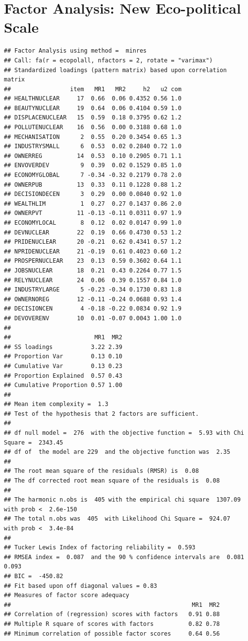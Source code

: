 \documentclass[
]{article}
\begin{document}
\newpage

\hypertarget{factor-analysis-new-eco-political-scale}{%
\section{Factor Analysis: New Eco-political
Scale}\label{factor-analysis-new-eco-political-scale}}

\begin{verbatim}
## Factor Analysis using method =  minres
## Call: fa(r = ecopolall, nfactors = 2, rotate = "varimax")
## Standardized loadings (pattern matrix) based upon correlation matrix
##                 item   MR1   MR2     h2   u2 com
## HEALTHNUCLEAR     17  0.66  0.06 0.4352 0.56 1.0
## BEAUTYNUCLEAR     19  0.64  0.06 0.4104 0.59 1.0
## DISPLACENUCLEAR   15  0.59  0.18 0.3795 0.62 1.2
## POLLUTENUCLEAR    16  0.56  0.00 0.3188 0.68 1.0
## MECHANISATION      2  0.55  0.20 0.3454 0.65 1.3
## INDUSTRYSMALL      6  0.53  0.02 0.2840 0.72 1.0
## OWNERREG          14  0.53  0.10 0.2905 0.71 1.1
## ENVOVERDEV         9  0.39  0.02 0.1529 0.85 1.0
## ECONOMYGLOBAL      7 -0.34 -0.32 0.2179 0.78 2.0
## OWNERPUB          13  0.33  0.11 0.1228 0.88 1.2
## DECISIONDECEN      3  0.29  0.00 0.0840 0.92 1.0
## WEALTHLIM          1  0.27  0.27 0.1437 0.86 2.0
## OWNERPVT          11 -0.13 -0.11 0.0311 0.97 1.9
## ECONOMYLOCAL       8  0.12  0.02 0.0147 0.99 1.0
## DEVNUCLEAR        22  0.19  0.66 0.4730 0.53 1.2
## PRIDENUCLEAR      20 -0.21  0.62 0.4341 0.57 1.2
## NPRIDENUCLEAR     21 -0.19  0.61 0.4023 0.60 1.2
## PROSPERNUCLEAR    23  0.13  0.59 0.3602 0.64 1.1
## JOBSNUCLEAR       18  0.21  0.43 0.2264 0.77 1.5
## RELYNUCLEAR       24  0.06  0.39 0.1557 0.84 1.0
## INDUSTRYLARGE      5 -0.23 -0.34 0.1730 0.83 1.8
## OWNERNOREG        12 -0.11 -0.24 0.0688 0.93 1.4
## DECISIONCEN        4 -0.18 -0.22 0.0834 0.92 1.9
## DEVOVERENV        10  0.01 -0.07 0.0043 1.00 1.0
## 
##                        MR1  MR2
## SS loadings           3.22 2.39
## Proportion Var        0.13 0.10
## Cumulative Var        0.13 0.23
## Proportion Explained  0.57 0.43
## Cumulative Proportion 0.57 1.00
## 
## Mean item complexity =  1.3
## Test of the hypothesis that 2 factors are sufficient.
## 
## df null model =  276  with the objective function =  5.93 with Chi Square =  2343.45
## df of  the model are 229  and the objective function was  2.35 
## 
## The root mean square of the residuals (RMSR) is  0.08 
## The df corrected root mean square of the residuals is  0.08 
## 
## The harmonic n.obs is  405 with the empirical chi square  1307.09  with prob <  2.6e-150 
## The total n.obs was  405  with Likelihood Chi Square =  924.07  with prob <  3.4e-84 
## 
## Tucker Lewis Index of factoring reliability =  0.593
## RMSEA index =  0.087  and the 90 % confidence intervals are  0.081 0.093
## BIC =  -450.82
## Fit based upon off diagonal values = 0.83
## Measures of factor score adequacy             
##                                                    MR1  MR2
## Correlation of (regression) scores with factors   0.91 0.88
## Multiple R square of scores with factors          0.82 0.78
## Minimum correlation of possible factor scores     0.64 0.56
\end{verbatim}
\end{document}
